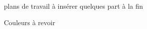 \bigskip

{\red plans de travail à insérer quelques part à la fin \par
Couleurs à revoir}

\ \\ [10mm]

\vfill

\pagebreak

\newcommand\gm[2]{\rput(2,#1){\begin{minipage}{6cm}\centering\textcolor{Green}{#2}\end{minipage}}}
\newcommand\nc[2]{\rput(6,#1){\begin{minipage}{7cm} \centering\textcolor{Red}{#2}\end{minipage}}}
\newcommand\eg[2]{\rput(10,#1){\begin{minipage}{6cm}\centering\textcolor{DodgerBlue}{#2}\end{minipage}}}
\newcommand\ogd[2]{\rput(14,#1){\begin{minipage}{6cm}\centering\textcolor{violet}{#2}\end{minipage}}}

